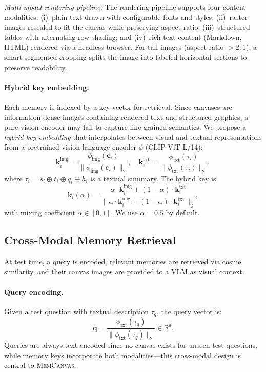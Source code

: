 \documentclass{article}
\newcommand{\memcanvas}{\textsc{MemCanvas}}
\begin{document}
\emph{Multi-modal rendering pipeline.}
The rendering pipeline supports four content modalities: (i)~plain text drawn with configurable fonts and styles; (ii)~raster images rescaled to fit the canvas while preserving aspect ratio; (iii)~structured tables with alternating-row shading; and (iv)~rich-text content (Markdown, HTML) rendered via a headless browser. For tall images (aspect ratio $> 2{:}1$), a smart segmented cropping splits the image into labeled horizontal sections to preserve readability.

\paragraph{Hybrid key embedding.}
Each memory is indexed by a key vector for retrieval. Since canvases are information-dense images containing rendered text and structured graphics, a pure vision encoder may fail to capture fine-grained semantics. We propose a \emph{hybrid key embedding} that interpolates between visual and textual representations from a pretrained vision-language encoder $\phi$ (CLIP ViT-L/14):
\begin{equation}
  \mathbf{k}_i^{\text{img}} = \frac{\phi_{\text{img}}(\mathbf{c}_i)}{\|\phi_{\text{img}}(\mathbf{c}_i)\|_2}, \quad
  \mathbf{k}_i^{\text{txt}} = \frac{\phi_{\text{txt}}(\tau_i)}{\|\phi_{\text{txt}}(\tau_i)\|_2},
  \label{eq:keys}
\end{equation}
where $\tau_i = s_i \oplus t_i \oplus q_i \oplus h_i$ is a textual summary. The hybrid key is:
\begin{equation}
  \mathbf{k}_i(\alpha) = \frac{\alpha \cdot \mathbf{k}_i^{\text{img}} + (1 - \alpha) \cdot \mathbf{k}_i^{\text{txt}}}{\|\alpha \cdot \mathbf{k}_i^{\text{img}} + (1 - \alpha) \cdot \mathbf{k}_i^{\text{txt}}\|_2},
  \label{eq:hybrid_key}
\end{equation}
with mixing coefficient $\alpha \in [0, 1]$. We use $\alpha = 0.5$ by default.

\subsection{Cross-Modal Memory Retrieval}
\label{sec:retrieval}

At test time, a query is encoded, relevant memories are retrieved via cosine similarity, and their canvas images are provided to a VLM as visual context.

\paragraph{Query encoding.}
Given a test question with textual description $\tau_q$, the query vector is:
\begin{equation}
  \mathbf{q} = \frac{\phi_{\text{txt}}(\tau_q)}{\|\phi_{\text{txt}}(\tau_q)\|_2} \in \mathbb{R}^d.
\end{equation}
Queries are always text-encoded since no canvas exists for unseen test questions, while memory keys incorporate both modalities---this cross-modal design is central to \memcanvas{}.
\end{document}
